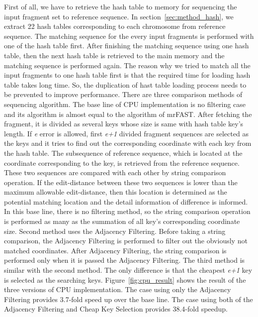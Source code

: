 First of all, we have to retrieve the hash table to memory for sequencing the
input fragment set to reference sequence. In section~\ref{sec:method_hash}, we
extract 22 hash tables corresponding to each chromosome from reference
sequence.  The matching sequence for the every input fragments is performed
with one of the hash table first. After finishing the matching sequence using
one hash table, then the next hash table is retrieved to the main memory and
the matching sequence is performed again. The reason why we tried to match all
the input fragments to one hash table first is that the required time for
loading hash table takes long time. So, the duplication of hast table loading
process needs to be prevented to improve performance. There are three
comparison methods of sequencing algorithm. The base line of CPU implementation
is no filtering case and its algorithm is almost equal to the algorithm of
mrFAST. After fetching the fragment, it is divided as several keys whose size
is same with hash table key’s length. If \textit{e} error is allowed, first
\textit{e+1} divided fragment sequences are selected as the keys and it tries
to find out the corresponding coordinate with each key from the hash table. The
subsequence of reference sequence, which is located at the coordinate
corresponding to the key, is retrieved from the reference sequence. These two
sequences are compared with each other by string comparison operation. If the
edit-distance between these two sequences is lower than the maximum allowable
edit-distance, then this location is determined as the potential matching
location and the detail information of difference is informed. In this base
line, there is no filtering method, so the string comparison operation is
performed as many as the summation of all key’s corresponding coordinate size.
Second method uses the Adjacency Filtering. Before taking a string comparison,
the Adjacency Filtering is performed to filter out the obviously not matched
coordinates.  After Adjacency Filtering, the string comparison is performed
only when it is passed the Adjacency Filtering. The third method is similar
with the second method. The only difference is that the cheapest \textit{e+1}
key is selected as the searching keys. Figure~\ref{fig:cpu_result} shows the
result of the three versions of CPU implementation. The case using only the
Adjacency Filtering provides 3.7-fold speed up over the base line. The case
using both of the Adjacency Filtering and Cheap Key Selection provides
38.4-fold speedup.\\


